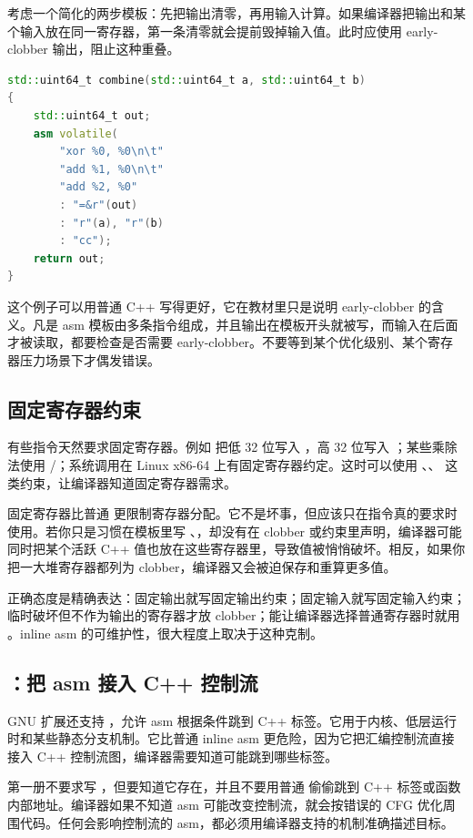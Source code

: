 考虑一个简化的两步模板：先把输出清零，再用输入计算。如果编译器把输出和某个输入放在同一寄存器，第一条清零就会提前毁掉输入值。此时应使用 early-clobber 输出，阻止这种重叠。

\begin{lstlisting}[language=C++]
std::uint64_t combine(std::uint64_t a, std::uint64_t b)
{
    std::uint64_t out;
    asm volatile(
        "xor %0, %0\n\t"
        "add %1, %0\n\t"
        "add %2, %0"
        : "=&r"(out)
        : "r"(a), "r"(b)
        : "cc");
    return out;
}
\end{lstlisting}

这个例子可以用普通 C++ 写得更好，它在教材里只是说明 early-clobber 的含义。凡是 asm 模板由多条指令组成，并且输出在模板开头就被写，而输入在后面才被读取，都要检查是否需要 early-clobber。不要等到某个优化级别、某个寄存器压力场景下才偶发错误。

\subsection{固定寄存器约束}

有些指令天然要求固定寄存器。例如  把低 32 位写入 ，高 32 位写入 ；某些乘除法使用 /；系统调用在 Linux x86-64 上有固定寄存器约定。这时可以使用 、、 这类约束，让编译器知道固定寄存器需求。

固定寄存器比普通  更限制寄存器分配。它不是坏事，但应该只在指令真的要求时使用。若你只是习惯在模板里写 、，却没有在 clobber 或约束里声明，编译器可能同时把某个活跃 C++ 值也放在这些寄存器里，导致值被悄悄破坏。相反，如果你把一大堆寄存器都列为 clobber，编译器又会被迫保存和重算更多值。

正确态度是精确表达：固定输出就写固定输出约束；固定输入就写固定输入约束；临时破坏但不作为输出的寄存器才放 clobber；能让编译器选择普通寄存器时就用 。inline asm 的可维护性，很大程度上取决于这种克制。

\subsection{：把 asm 接入 C++ 控制流}

GNU 扩展还支持 ，允许 asm 根据条件跳到 C++ 标签。它用于内核、低层运行时和某些静态分支机制。它比普通 inline asm 更危险，因为它把汇编控制流直接接入 C++ 控制流图，编译器需要知道可能跳到哪些标签。

第一册不要求写 ，但要知道它存在，并且不要用普通  偷偷跳到 C++ 标签或函数内部地址。编译器如果不知道 asm 可能改变控制流，就会按错误的 CFG 优化周围代码。任何会影响控制流的 asm，都必须用编译器支持的机制准确描述目标。

